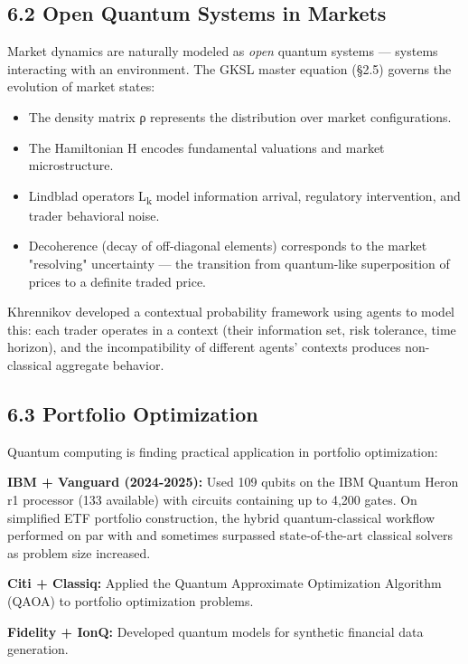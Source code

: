 \documentclass[11pt]{article}
\begin{document}
\subsection{6.2 Open Quantum Systems in Markets}
\label{sec:orge6ea420}

Market dynamics are naturally modeled as \emph{open} quantum systems --- systems
interacting with an environment. The GKSL master equation (§2.5) governs the
evolution of market states:

\begin{itemize}
\item The density matrix ρ represents the distribution over market configurations.
\item The Hamiltonian H encodes fundamental valuations and market microstructure.
\item Lindblad operators L\textsubscript{k} model information arrival, regulatory intervention,
and trader behavioral noise.
\item Decoherence (decay of off-diagonal elements) corresponds to the market
"resolving" uncertainty --- the transition from quantum-like superposition of
prices to a definite traded price.
\end{itemize}

Khrennikov developed a contextual probability framework using agents to model
this: each trader operates in a context (their information set, risk tolerance,
time horizon), and the incompatibility of different agents' contexts produces
non-classical aggregate behavior.
\subsection{6.3 Portfolio Optimization}
\label{sec:orgc743081}

Quantum computing is finding practical application in portfolio optimization:

\textbf{IBM + Vanguard (2024-2025):} Used 109 qubits on the IBM Quantum Heron r1
processor (133 available) with circuits containing up to 4,200 gates. On
simplified ETF portfolio construction, the hybrid quantum-classical workflow
performed on par with and sometimes surpassed state-of-the-art classical solvers
as problem size increased.

\textbf{Citi + Classiq:} Applied the Quantum Approximate Optimization Algorithm (QAOA)
to portfolio optimization problems.

\textbf{Fidelity + IonQ:} Developed quantum models for synthetic financial data
generation.
\end{document}
